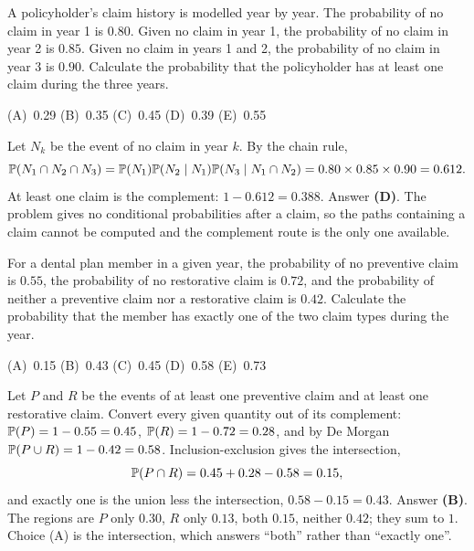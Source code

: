 \begin{example}
A policyholder's claim history is modelled year by year. The probability of no claim in year 1 is
$0.80$. Given no claim in year 1, the probability of no claim in year 2 is $0.85$. Given no claim
in years 1 and 2, the probability of no claim in year 3 is $0.90$.
Calculate the probability that the policyholder has at least one claim during the three years.
\par\smallskip\noindent (A)~0.29 \quad (B)~0.35 \quad (C)~0.45 \quad (D)~0.39 \quad (E)~0.55
\end{example}
\begin{solution}
Let $N_k$ be the event of no claim in year $k$. By the chain rule,
\[
\mathbb{P}(N_1 \cap N_2 \cap N_3) = \mathbb{P}(N_1)\mathbb{P}(N_2 \mid N_1)\mathbb{P}(N_3 \mid N_1 \cap N_2)
 = 0.80 \times 0.85 \times 0.90 = 0.612.
\]
At least one claim is the complement: $1 - 0.612 = 0.388$. Answer \textbf{(D)}. The problem gives no
conditional probabilities after a claim, so the paths containing a claim cannot be computed and
the complement route is the only one available.
\end{solution}

\begin{example}
For a dental plan member in a given year, the probability of no preventive claim is $0.55$, the
probability of no restorative claim is $0.72$, and the probability of neither a preventive claim
nor a restorative claim is $0.42$.
Calculate the probability that the member has exactly one of the two claim types during the year.
\par\smallskip\noindent (A)~0.15 \qquad (B)~0.43 \qquad (C)~0.45 \qquad (D)~0.58 \qquad (E)~0.73
\end{example}
\begin{solution}
Let $P$ and $R$ be the events of at least one preventive claim and at least one restorative claim.
Convert every given quantity out of its complement: $\mathbb{P}(P) = 1 - 0.55 = 0.45$,
$\mathbb{P}(R) = 1 - 0.72 = 0.28$, and by De Morgan $\mathbb{P}(P \cup R) = 1 - 0.42 = 0.58$.
Inclusion-exclusion gives the intersection,
\[
\mathbb{P}(P \cap R) = 0.45 + 0.28 - 0.58 = 0.15,
\]
and exactly one is the union less the intersection, $0.58 - 0.15 = 0.43$. Answer \textbf{(B)}.
The regions are $P$ only $0.30$, $R$ only $0.13$, both $0.15$, neither $0.42$; they sum to $1$.
Choice (A) is the intersection, which answers ``both'' rather than ``exactly one''.
\end{solution}

